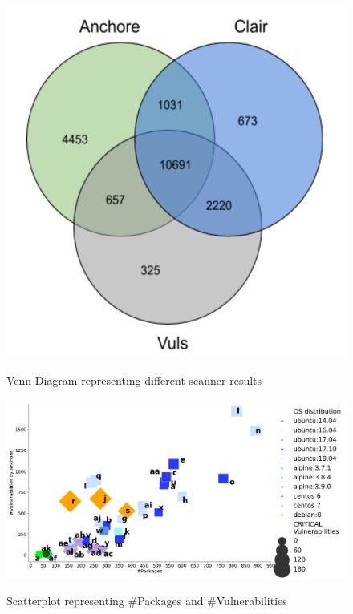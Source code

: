 \documentclass[a4paper,num-refs]{oup-contemporary}
\begin{document}
\begin{figure}[!htb]
        {\includegraphics[scale=2.5,width=\columnwidth]
        {Figures/vennDiagram.png}}
        \caption{\label{fig:venn} Venn Diagram representing different scanner results}
\end{figure}

\begin{figure}[!htb]
        {\includegraphics[scale=2,width=\columnwidth]
        {Figures/vulngraph4.png}}
        \caption{\label{fig:graph1} Scatterplot representing \#Packages and \#Vulnerabilities}
      \end{figure}
\end{document}
